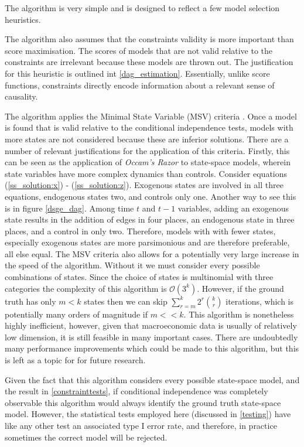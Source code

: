 \documentclass{article}
\begin{document}
The algorithm is very simple and is designed to reflect a few model selection heuristics. 

The algorithm also assumes that the constraints validity is more important than score maximisation. The scores of models that are not valid relative to the constraints are irrelevant because these models are thrown out. The justification for this heuristic is outlined int \ref{dag_estimation}. Essentially, unlike score functions, constraints directly encode information about a relevant sense of causality.

The algorithm applies the Minimal State Variable (MSV) criteria \parencite{mccallum1999role}. Once a model is found that is valid relative to the conditional independence tests, models with more states are not considered because these are inferior solutions. There are a number of relevant justifications for the application of this criteria. Firstly, this can be seen as the application of \textit{Occam's Razor} to state-space models, wherein state variables have more complex dynamics than controls. Consider equations (\ref{ss_solution:x}) - (\ref{ss_solution:z}). Exogenous states are involved in all three equations, endogenous states two, and controls only one. Another way to see this is in figure \ref{dsge_dag}. Among time $t$ and $t-1$ variables, adding an exogenous state results in the addition of edges in four places, an endogenous state in three places, and a control in only two. Therefore, models with with fewer states, especially exogenous states are more parsimonious and are therefore preferable, all else equal. The MSV criteria also allows for a potentially very large increase in the speed of the algorithm. Without it we must consider every possible combinations of states. Since the choice of states is multinomial with three categories the complexity of this algorithm is $\mathcal{O}(3^k)$. However, if the ground truth has only $m < k$ states then we can skip $\sum_{r=m}^{k} 2^r {\binom{k}{r}}$ iterations, which is potentially many orders of magnitude if $m << k$. This algorithm is nonetheless highly inefficient, however, given that macroeconomic data is usually of relatively low dimension, it is still feasible in many important cases. There are undoubtedly many performance improvements which could be made to this algorithm, but this is left as a topic for for future research.

Given the fact that this algorithm considers every possible state-space model, and the result in \ref{constrainttests}, if conditional independence was completely observable this algorithm would always identify the ground truth state-space model. However, the statistical tests employed here (discussed in \ref{testing}) have like any other test an associated type I error rate, and therefore, in practice sometimes the correct model will be rejected. 
\end{document}
